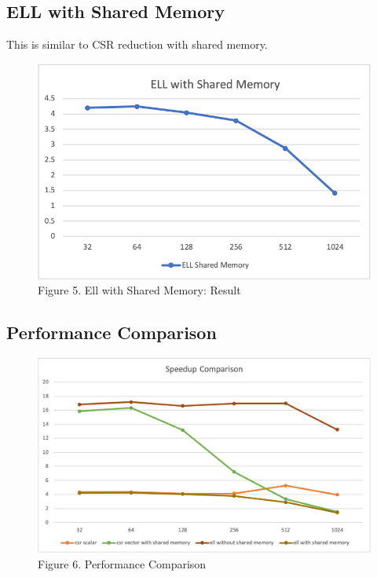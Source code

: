 \documentclass[a4paper,11pt,BCOR10mm,oneside,headsepline]{scrartcl}
\begin{document}
		\subsection{ELL with Shared Memory}
		This is similar to CSR reduction with shared memory.
		
		\begin{figure}[!htbp]
			\centering
			\includegraphics[scale=0.5]{./figures/ell_shared_result}
			\caption*{Figure 5. Ell with Shared Memory: Result}
		\end{figure}
		
		\newpage
		\subsection{Performance Comparison}
			\begin{figure}[!htbp]
				\centering
				\includegraphics[scale=0.5]{./figures/comparison}
				\caption*{Figure 6. Performance Comparison}
			\end{figure}
\end{document}
